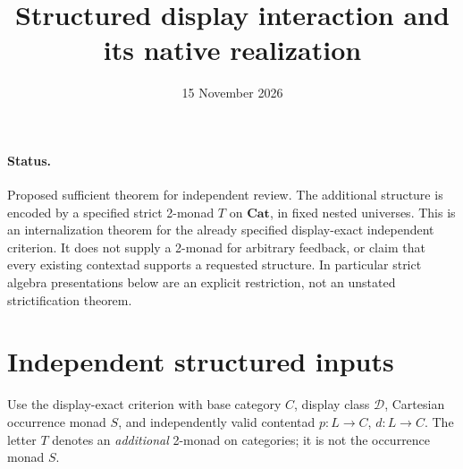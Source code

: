 \documentclass[11pt]{article}
\title{Structured display interaction and its native realization}
\date{15 November 2026}
\begin{document}
\maketitle
\paragraph{Status.} Proposed sufficient theorem for independent review. The additional structure is encoded by a specified strict 2-monad $T$ on $\mathbf{Cat}$, in fixed nested universes. This is an internalization theorem for the already specified display-exact independent criterion. It does not supply a 2-monad for arbitrary feedback, or claim that every existing contextad supports a requested structure. In particular strict algebra presentations below are an explicit restriction, not an unstated strictification theorem.

\section{Independent structured inputs}
Use the display-exact criterion with base category $C$, display class $\mathcal D$, Cartesian occurrence monad $S$, and independently valid contentad $p:L\to C$, $d:L\to C$. The letter $T$ denotes an \emph{additional} 2-monad on categories; it is not the occurrence monad $S$.
\end{document}
